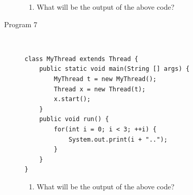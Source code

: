 \documentclass[11pt,a4paper]{article}
\def\AnswerBox{\fbox{\begin{minipage}{4in}\hfill\vspace{0.5in}\end{minipage}}}
\begin{document}
\begin{description}
\AnswerBox

\begin{enumerate}[label=\bfseries Q\arabic*:]\itemsep10pt
        \item What will be the output of the above code?
    \end{enumerate}
\item [Program 7] \
\begin{lstlisting}
class MyThread extends Thread {
    public static void main(String [] args) {
        MyThread t = new MyThread();
        Thread x = new Thread(t);
        x.start();
    }
    public void run() {
        for(int i = 0; i < 3; ++i) {
            System.out.print(i + "..");
        }
    }
}
\end{lstlisting}

\AnswerBox

\begin{enumerate}[label=\bfseries Q\arabic*:]\itemsep10pt
 \item What will be the output of the above code?
\end{enumerate}
\end{description}
\end{document}
